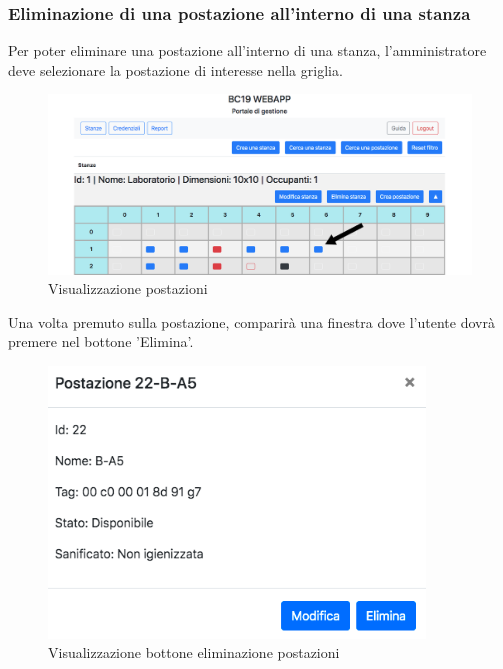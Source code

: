 \subsubsection{Eliminazione di una postazione all'interno di una stanza}
Per poter eliminare una postazione all'interno di una stanza, l'amministratore deve selezionare la postazione di interesse nella griglia.
\begin{figure}[H]
	\centering
	\includegraphics[width=15cm]{res/images/postDaEliminare.png}
	\caption{Visualizzazione postazioni}
\end{figure}
Una volta premuto sulla postazione, comparirà una finestra dove l'utente dovrà premere nel bottone 'Elimina'.
\begin{figure}[H]
	\centering
	\includegraphics[width=10cm]{res/images/bottoneCestinoWorkstation.png}
	\caption{Visualizzazione bottone eliminazione postazioni}
\end{figure}


